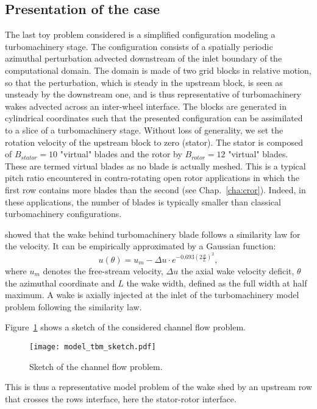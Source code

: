 
\subsection{Presentation of the case}

The last toy problem considered is a simplified 
configuration modeling a turbomachinery 
stage. The configuration consists of a spatially 
periodic azimuthal perturbation advected downstream 
of the inlet boundary of the computational domain. 
The domain is made of two grid blocks in relative 
motion, so that the perturbation, which is steady 
in the upstream block, is seen as unsteady by the 
downstream one, and is thus representative of 
turbomachinery wakes advected across an inter-wheel interface.
The blocks are generated in cylindrical
coordinates such that the presented configuration
can be assimilated to a slice of 
a turbomachinery stage.
Without loss of generality, 
we set the rotation velocity of the upstream block to zero (stator). 
The stator is composed of $B_{stator} = 10$
"virtual" blades and the rotor by $B_{rotor} = 12$ "virtual" blades.
These are termed virtual blades as no blade is actually meshed.
This is a typical pitch ratio encountered 
in contra-rotating open rotor applications in which 
the first row contains more blades 
than the second (see Chap.~\ref{cha:cror}). Indeed, in
these applications, the number
of blades is typically smaller than classical
turbomachinery configurations.

\citet{Lakshminarayana1980} showed that the wake
behind turbomachinery blade follows a similarity law for the velocity. 
It can be empirically approximated by a Gaussian function:
\begin{equation}
    u (\theta) = u_m - 
        \Delta u \cdot e^{
          -0.693 \left( 2 \frac{\theta}{L} \right) ^ 2},
    \label{eq:similarity}
\end{equation}
where $u_m$ denotes the free-stream velocity, $\Delta u$ the axial wake velocity deficit,
$\theta$ the azimuthal coordinate and $L$ the wake width,
defined as the full width at half maximum.
A wake is axially injected at the inlet of the
turbomachinery model problem following the \citet{Lakshminarayana1980}
similarity law.

Figure~\ref{fig:model_tbm_sketch} shows a sketch
of the considered channel flow problem.
\begin{figure}[htb]
  \centering
  \texttt{[image: model\_tbm\_sketch.pdf]}
  \caption{Sketch of the channel flow problem.}
  \label{fig:model_tbm_sketch}
\end{figure}
This is thus a representative model problem of the wake shed
by an upstream row that crosses the rows interface, 
here the stator-rotor interface.

